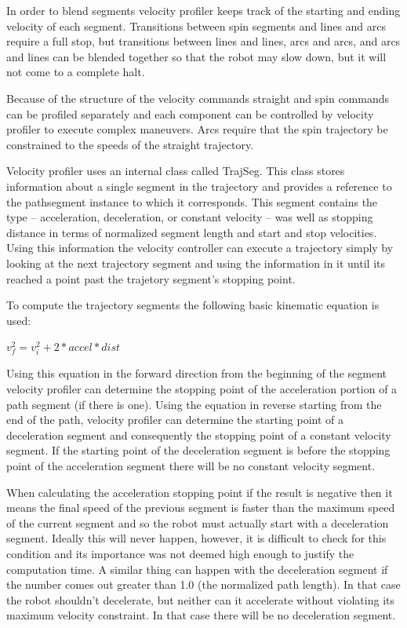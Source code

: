 In order to blend segments velocity profiler keeps track of the starting and ending velocity of each segment. Transitions between spin segments and lines and arcs require a full stop, but transitions between lines and lines, arcs and arcs, and arcs and lines can be blended together so that the robot may slow down, but it will not come to a complete halt.

Because of the structure of the velocity commands straight and spin commands can be profiled separately and each component can be controlled by velocity profiler to execute complex maneuvers. Arcs require that the spin trajectory be constrained to the speeds of the straight trajectory.

Velocity profiler uses an internal class called TrajSeg.  This class stores information about a single segment in the trajectory and provides a reference to the pathsegment instance to which it corresponds. This segment contains the type -- acceleration, deceleration, or constant velocity -- was well as stopping distance in terms of normalized segment length and start and stop velocities.  Using this information the velocity controller can execute a trajectory simply by looking at the next trajectory segment and using the information in it until its reached a point past the trajetory segment's stopping point.

To compute the trajectory segments the following basic kinematic equation is used:
\begin{center}
$v_f^2 = v_i^2 + 2*accel*dist$
\end{center}
Using this equation in the forward direction from the beginning of the segment velocity profiler can determine the stopping point of the acceleration portion of a path segment (if there is one). Using the equation in reverse starting from the end of the path, velocity profiler can determine the starting point of a deceleration segment and consequently the stopping point of a constant velocity segment.  If the starting point of the deceleration segment is before the stopping point of the acceleration segment there will be no constant velocity segment.

When calculating the acceleration stopping point if the result is negative then it means the final speed of the previous segment is faster than the maximum speed of the current segment and so the robot must actually start with a deceleration segment. Ideally this will never happen, however, it is difficult to check for this condition and its importance was not deemed high enough to justify the computation time. A similar thing can happen with the deceleration segment if the number comes out greater than 1.0 (the normalized path length). In that case the robot shouldn't decelerate, but neither can it accelerate without violating its maximum velocity constraint. In that case there will be no deceleration segment.

